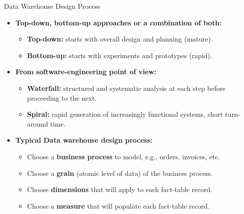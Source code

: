 \begin{frame}{Data Warehouse Design Process}
	\begin{itemize}
		\item \textbf{Top-down, bottom-up approaches or a combination of both:}
		      \begin{itemize}
			      \item \textbf{\color{airforceblue}Top-down:} starts with overall design and planning (mature).
			      \item \textbf{\color{airforceblue}Bottom-up:} starts with experiments and prototypes (rapid).
		      \end{itemize}
		\item \textbf{From software-engineering point of view:}
		      \begin{itemize}
			      \item \textbf{\color{airforceblue}Waterfall:} structured and systematic analysis at each step before proceeding to the next.
			      \item \textbf{\color{airforceblue}Spiral:} rapid generation of increasingly functional systems, short turn-around time.
		      \end{itemize}
		\item \textbf{Typical Data warehouse design process:}
		      \begin{itemize}
			      \item Choose a \textbf{\color{airforceblue}business process} to model, e.g., orders, invoices, etc.
			      \item Choose a \textbf{\color{airforceblue}grain} (atomic level of data) of the business process.
			      \item Choose \textbf{\color{airforceblue}dimensions} that will apply to each fact-table record.
			      \item Choose a \textbf{\color{airforceblue}measure} that will populate each fact-table record.
		      \end{itemize}
	\end{itemize}
\end{frame}

